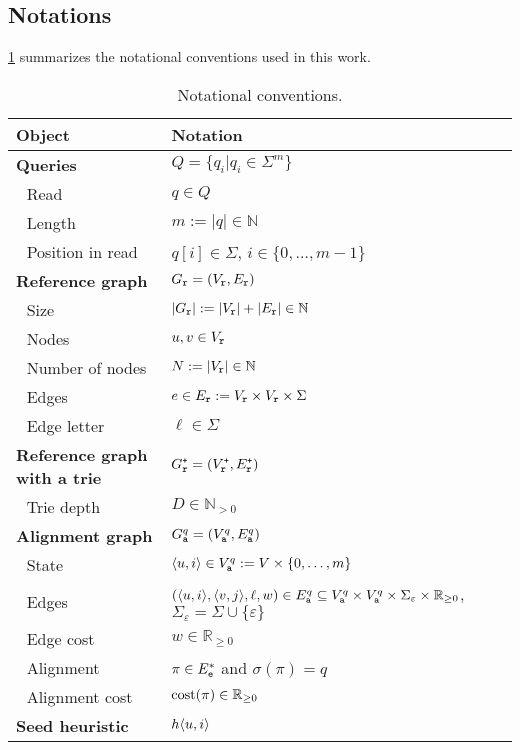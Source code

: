 \subsection{Notations} \label{sec:notation}

\cref{tab:notation} summarizes the notational conventions used in this work.

\begin{table}[!h]
	\centering
	\caption{Notational conventions.}\label{tab:notation}
	\begin{tabular}{ll}
	\hline
	\textbf{Object}	         & \textbf{Notation}\\
	\hline
	\textbf{Queries}  & $Q = \{ q_i \vert q_i \in \Sigma^m \}$ \\
	\,\, Read            & $q \in Q$ \\
	\,\, Length     & $m := \lvert q \rvert\in \mathbb{N}$\\
	\,\, Position in read & $q[i] \in \Sigma$, $i \in \{0,\dots,m-1\}$\\	
	\hline
	\textbf{Reference graph}& $G_\texttt{r}=(V_\texttt{r},E_\texttt{r})$\\
	\,\, Size& $\lvert G_\texttt{r} \rvert := \lvert V_\texttt{r} \rvert + \lvert E_\texttt{r} \rvert \in \mathbb{N}$\\
	\,\, Nodes& $u, v \in V_\texttt{r}$\\
	\,\, Number of nodes& $N := \lvert V_\texttt{r} \rvert \in \mathbb{N}$\\
	\,\, Edges& $e \in E_\texttt{r} := V_\texttt{r} \times V_\texttt{r} \times \Sigma$\\
	\,\, Edge letter& $\ell \in \Sigma$\\
	\textbf{Reference graph with a trie} & $G_\texttt{r}^\texttt{+} = (V_\texttt{r}^\texttt{+}, E_\texttt{r}^\texttt{+})$ \\
	\,\, Trie depth  & $D \in \mathbb{N}_{>0}$\\
	\hline
	\textbf{Alignment graph}& $G_\texttt{a}^{q}=(V_\texttt{a}^{q},E_\texttt{a}^{q})$\\
	\,\, State& $\langle u,i \rangle \in V_\texttt{a}^{q} := V \times \{0,\dots,m\}$\\
	\,\, Edges& $(\langle u,i \rangle, \langle v,j \rangle,\ell,w) \in E_\texttt{a}^{q}
	\subseteq V_\texttt{a}^{q} \times V_\texttt{a}^{q} \times \Sigma_{\varepsilon} \times
	\mathbb{R}_{\geq 0}$, $\Sigma_{\varepsilon} = \Sigma \cup \{\varepsilon\}$\\
	\,\, Edge cost& $w \in \mathbb{R}_{\geq 0}$\\
	\,\, Alignment& $\pi \in E_\texttt{e}^*$ and $\sigma(\pi)=q$ \\
	\,\, Alignment cost& $\text{cost}(\pi) \in \mathbb{R}_{\geq 0}$\\
	\hline
	\textbf{Seed heuristic}& $h\langle u, i \rangle$\\

\end{tabular}
\end{table}
